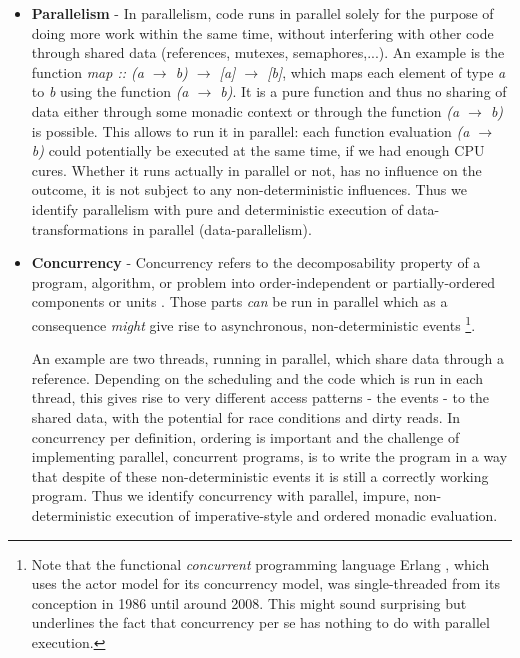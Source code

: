 \begin{itemize}
	\item \textbf{Parallelism} - In parallelism, code runs in parallel solely for the purpose of doing more work within the same time, without interfering with other code through shared data (references, mutexes, semaphores,...). An example is the function \textit{map :: (a $\rightarrow$ b) $\rightarrow$ [a] $\rightarrow$ [b]}, which maps each element of type \textit{a} to \textit{b} using the function \textit{(a $\rightarrow$ b)}. It is a pure function and thus no sharing of data either through some monadic context or through the function \textit{(a $\rightarrow$ b)} is possible. This allows to run it in parallel: each function evaluation \textit{(a $\rightarrow$ b)} could potentially be executed at the same time, if we had enough CPU cures. Whether it runs actually in parallel or not, has no influence on the outcome, it is not subject to any non-deterministic influences. Thus we identify parallelism with pure and deterministic execution of data-transformations in parallel (data-parallelism).

	\item \textbf{Concurrency} - Concurrency refers to the decomposability property of a program, algorithm, or problem into order-independent or partially-ordered components or units \cite{lamport_time_1978}. Those parts \textit{can} be run in parallel which as a consequence \textit{might} give rise to asynchronous, non-deterministic events \footnote{Note that the functional \textit{concurrent} programming language Erlang \cite{armstrong_erlang_2010}, which uses the actor model for its concurrency model, was single-threaded from its conception in 1986 until around 2008. This might sound surprising but underlines the fact that concurrency per se has nothing to do with parallel execution.}.

	An example are two threads, running in parallel, which share data through a reference. Depending on the scheduling and the code which is run in each thread, this gives rise to very different access patterns - the events - to the shared data, with the potential for race conditions and dirty reads. In concurrency per definition, ordering is important and the challenge of implementing parallel, concurrent programs, is to write the program in a way that despite of these non-deterministic events it is still a correctly working program. Thus we identify concurrency with parallel, impure, non-deterministic execution of imperative-style and ordered monadic evaluation.
\end{itemize}

